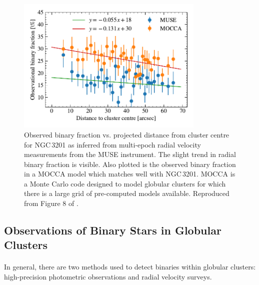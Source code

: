 \begin{figure}
	\centering
	\includegraphics[width=0.8\textwidth]{figures/radial_binarity.pdf}
\caption{Observed binary fraction vs. projected distance from cluster centre for NGC\,3201 as
	inferred from multi-epoch radial velocity measurements from the MUSE instrument.
	The slight trend in radial binary fraction is visible. Also plotted is the observed
	binary fraction in a MOCCA model which matches well with NGC\,3201. MOCCA is a Monte
	Carlo code designed to model globular clusters for which there is a large grid of
	pre-computed models available. Reproduced from Figure 8 of \citet{Giesers2019}.}
	\label{fig:1/radial_binary_fraction}
\end{figure}

\subsection{Observations of Binary Stars in Globular Clusters}

\paragraph{}
In general, there are two methods used to detect binaries within globular clusters: high-precision
photometric observations and radial velocity surveys.


